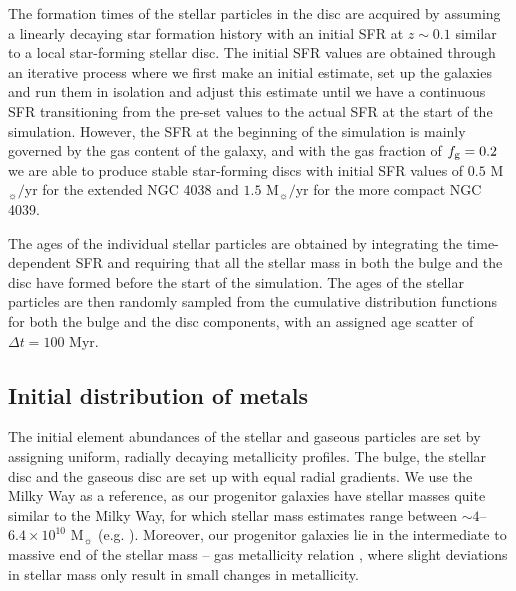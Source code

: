\documentclass[a4paper,fleqn,usenatbib]{mnras}
\begin{document}
The formation times of the stellar particles in the disc are acquired by 
assuming a linearly decaying star formation 
history with an initial SFR at $z\sim 0.1$ similar to a local star-forming stellar disc. The initial
SFR values are obtained through an iterative process where we first make an 
initial estimate, set up the galaxies and run them in isolation and adjust this estimate 
until we have a continuous SFR transitioning from the pre-set values 
to the actual SFR at the start of the simulation. However, the SFR at the beginning of the simulation
is mainly governed by the gas content of the galaxy, and with the gas fraction of $f_{\rm g}=0.2$ 
we are able to produce stable star-forming discs with initial SFR values of
$0.5$ M$_{\sun}/$yr for the extended NGC
4038 and $1.5$ M$_{\sun}/$yr for the more compact NGC 4039.

The ages of the individual stellar particles are obtained by integrating the time-dependent SFR
and requiring that all the stellar mass in both the bulge and the disc have 
formed before the start of the simulation. The ages of the 
stellar particles are then randomly sampled from the cumulative distribution functions
for both the bulge and the disc components, with an assigned age scatter of $\Delta t=100$ Myr. 

\subsection{Initial distribution of metals}\label{section:metallicity_description}

The initial element abundances of the stellar and gaseous particles are set 
by assigning uniform, radially decaying metallicity profiles.
The bulge, the stellar disc and the gaseous disc are set 
up with equal radial gradients. 
We use the Milky Way as a reference, as our progenitor 
galaxies have stellar masses quite similar to the Milky Way, for which stellar mass estimates range between 
$\sim 4$--$6.4\times 10^{10}$ M$_{\sun}$ (e.g. \citealt{2002ApJ...573..597K, 2011MNRAS.414.2446M}).
Moreover, our progenitor galaxies lie in the intermediate to massive end of the
stellar mass --  gas metallicity relation \citep{2004ApJ...613..898T}, where slight deviations
in stellar mass only result in small changes in metallicity.
\end{document}
